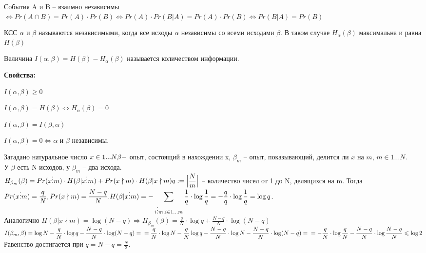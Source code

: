 	\begin{Def} 
		События A и B -- взаимно независимы $\Leftrightarrow Pr(A \cap B) = Pr(A) \cdot Pr(B) \Leftrightarrow Pr(A) \cdot Pr(B|A) = Pr(A) \cdot Pr(B) \Leftrightarrow Pr(B|A) = Pr(B)$
	\end{Def} 

	\begin{Def} 
	КСС $\alpha$ и $\beta$ называются независимыми, когда все исходы $\alpha$ независимы со всеми исходами $\beta$. В таком случае $H_{\alpha} (\beta)$ максимальна и равна $H(\beta)$
	\end{Def} 
	

	\begin{Def} 
		Величина $I(\alpha, \beta) = H(\beta) - H_{\alpha} (\beta)$ называется количеством информации.
	\end{Def} 

	\textbf{Свойства:}
	\begin{MyList}
		\item $I(\alpha, \beta) \geqslant 0$
		\item $I(\alpha, \beta) = H(\beta) \Leftrightarrow H_{\alpha} (\beta) = 0$
		\item $I(\alpha, \beta) = I(\beta, \alpha)$
		\item $I(\alpha, \beta) = 0 \Leftrightarrow \alpha \text{ и } \beta$ независимы.
	\end{MyList}
	
	\begin{Example}
		Загадано натуральное число $x \in 1...N\\
		\beta -$ опыт, состоящий в нахождении x, $\beta_m$ -- опыт, показывающий, делится ли $x$ на $m$, $m \in 1...N$.\\ У $\beta$ есть N исходов, у $\beta_m$ -- два исхода.\\
		$\displaystyle H_{\beta_m}(\beta) = Pr (x \vdots m) \cdot H(\beta | x \vdots m) + Pr (x \nmid m) \cdot H (\beta | x \nmid m)\\
		q := \Big| \frac{N}{m} \Big|$ -- количество чисел от 1 до N, делящихся на m. Тогда $\displaystyle Pr(x \vdots m) = \frac{q}{N}, Pr(x \nmid m) = \frac{N-q}{N}.\\
		H(\beta|x \vdots m) = - \sum_{i \vdots m, i \in 1...m} \frac{1}{q} \cdot \log \frac{1}{q} = - \frac{q}{q} \cdot \log \frac{1}{q} = \log q$.\\
		Аналогично $\displaystyle H(\beta | x \nmid m) = \log (N-q) \Rightarrow H_{\beta_m}(\beta) = \frac{q}{N} \cdot \log q + \frac{N-q}{N} \cdot \log (N-q)$\\
		$\displaystyle I(\beta_m, \beta) = \log N - \frac{q}{N} \cdot \log q - \frac{N-q}{N} \cdot \log (N-q) = \\
		= \frac{q}{N} \cdot \log N - \frac{q}{N} \log q - \frac{N-q}{N} \cdot \log N - \frac{N-q}{N} \cdot \log (N-q) =\\
		= - \frac{q}{N} \cdot \log \frac{q}{N} - \frac{N-q}{N} \cdot \log \frac{N-q}{N} \leqslant \log 2$\\
		Равенство  достигается при $q = N - q = \frac{N}{2}$.
	\end{Example}

